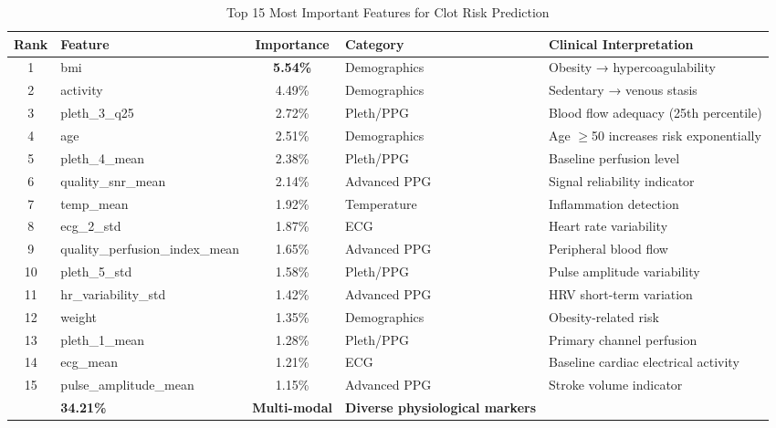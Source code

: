 \documentclass[3p,times,procedia]{elsarticle}
\begin{document}
\begin{table}[!ht]
\centering
\caption{Top 15 Most Important Features for Clot Risk Prediction}
\small
\begin{tabular}{|c|l|c|l|l|}
\hline
\rowcolor{gray!20}
\textbf{Rank} & \textbf{Feature} & \textbf{Importance} & \textbf{Category} & \textbf{Clinical Interpretation} \\
\hline
1 & bmi & \textbf{5.54\%} & Demographics & Obesity → hypercoagulability \\
\rowcolor{gray!10}
2 & activity & 4.49\% & Demographics & Sedentary → venous stasis \\
3 & pleth\_3\_q25 & 2.72\% & Pleth/PPG & Blood flow adequacy (25th percentile) \\
\rowcolor{gray!10}
4 & age & 2.51\% & Demographics & Age $\geq$50 increases risk exponentially \\
5 & pleth\_4\_mean & 2.38\% & Pleth/PPG & Baseline perfusion level \\
\rowcolor{gray!10}
6 & quality\_snr\_mean & 2.14\% & Advanced PPG & Signal reliability indicator \\
7 & temp\_mean & 1.92\% & Temperature & Inflammation detection \\
\rowcolor{gray!10}
8 & ecg\_2\_std & 1.87\% & ECG & Heart rate variability \\
9 & quality\_perfusion\_index\_mean & 1.65\% & Advanced PPG & Peripheral blood flow \\
\rowcolor{gray!10}
10 & pleth\_5\_std & 1.58\% & Pleth/PPG & Pulse amplitude variability \\
11 & hr\_variability\_std & 1.42\% & Advanced PPG & HRV short-term variation \\
\rowcolor{gray!10}
12 & weight & 1.35\% & Demographics & Obesity-related risk \\
13 & pleth\_1\_mean & 1.28\% & Pleth/PPG & Primary channel perfusion \\
\rowcolor{gray!10}
14 & ecg\_mean & 1.21\% & ECG & Baseline cardiac electrical activity \\
15 & pulse\_amplitude\_mean & 1.15\% & Advanced PPG & Stroke volume indicator \\
\hline
\rowcolor{gray!20}
\multicolumn{2}{|l|}{\textbf{Top 15 Combined}} & \textbf{34.21\%} & \textbf{Multi-modal} & \textbf{Diverse physiological markers} \\
\hline
\end{tabular}
\end{table}

\FloatBarrier
\vspace{10pt}
\end{document}
